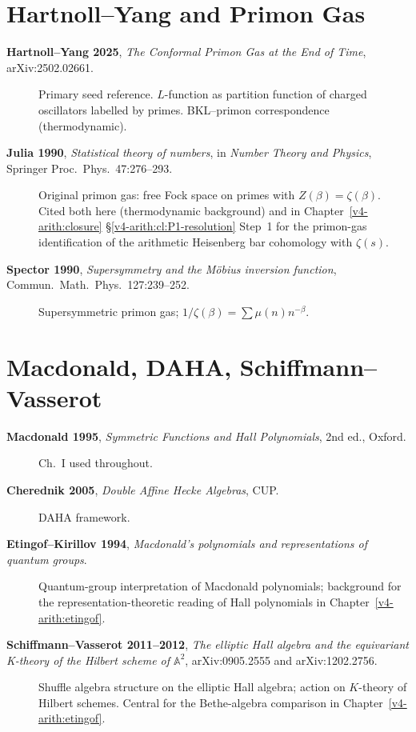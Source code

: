 \section{Hartnoll--Yang and Primon Gas}
\label{v4-arith:app:A:primon-gas}

\begin{description}
\item[\textbf{Hartnoll--Yang 2025}, \emph{The Conformal Primon Gas
at the End of Time}, arXiv:2502.02661.] Primary seed reference.
\(L\)-function as partition function of charged oscillators
labelled by primes. BKL--primon correspondence (thermodynamic).
\item[\textbf{Julia 1990}, \emph{Statistical theory of numbers}, in
\emph{Number Theory and Physics}, Springer Proc.~Phys.~47:276--293.]
Original primon gas: free Fock space on primes with
\(Z(\beta)=\zeta(\beta)\). Cited both here (thermodynamic background)
and in Chapter~\ref{v4-arith:closure}
\S\ref{v4-arith:cl:P1-resolution} Step~1 for the primon-gas
identification of the arithmetic Heisenberg bar cohomology with
\(\zeta(s)\).
\item[\textbf{Spector 1990}, \emph{Supersymmetry and the M\"obius
inversion function}, Commun.~Math.~Phys.~127:239--252.]
Supersymmetric primon gas; \(1/\zeta(\beta)=\sum\mu(n)n^{-\beta}\).
\end{description}

\section{Macdonald, DAHA, Schiffmann--Vasserot}
\label{v4-arith:app:A:macdonald}

\begin{description}
\item[\textbf{Macdonald 1995}, \emph{Symmetric Functions and Hall
Polynomials}, 2nd ed., Oxford.] Ch.~I used throughout.
\item[\textbf{Cherednik 2005}, \emph{Double Affine Hecke Algebras},
CUP.] DAHA framework.
\item[\textbf{Etingof--Kirillov 1994}, \emph{Macdonald's polynomials
and representations of quantum groups}.] Quantum-group interpretation
of Macdonald polynomials; background for the representation-theoretic
reading of Hall polynomials in Chapter~\ref{v4-arith:etingof}.
\item[\textbf{Schiffmann--Vasserot 2011--2012}, \emph{The elliptic
Hall algebra and the equivariant K-theory of the Hilbert scheme of
\(\mathbb{A}^{2}\)}, arXiv:0905.2555 and arXiv:1202.2756.] Shuffle
algebra structure on the elliptic Hall algebra; action on
\(K\)-theory of Hilbert schemes. Central for the Bethe-algebra
comparison in Chapter~\ref{v4-arith:etingof}.
\end{description}

